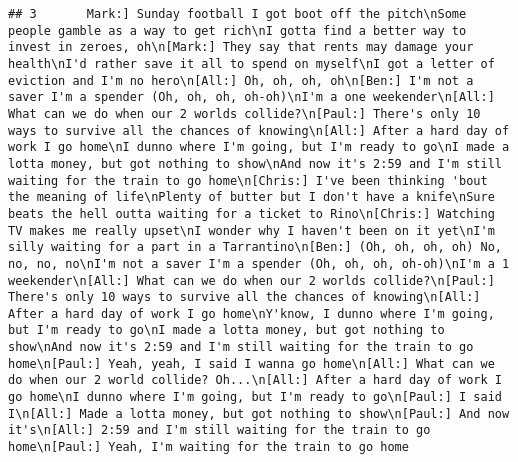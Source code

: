 \documentclass[]{article}
\begin{document}
\begin{verbatim}
## 3       Mark:] Sunday football I got boot off the pitch\nSome people gamble as a way to get rich\nI gotta find a better way to invest in zeroes, oh\n[Mark:] They say that rents may damage your health\nI'd rather save it all to spend on myself\nI got a letter of eviction and I'm no hero\n[All:] Oh, oh, oh, oh\n[Ben:] I'm not a saver I'm a spender (Oh, oh, oh, oh-oh)\nI'm a one weekender\n[All:] What can we do when our 2 worlds collide?\n[Paul:] There's only 10 ways to survive all the chances of knowing\n[All:] After a hard day of work I go home\nI dunno where I'm going, but I'm ready to go\nI made a lotta money, but got nothing to show\nAnd now it's 2:59 and I'm still waiting for the train to go home\n[Chris:] I've been thinking 'bout the meaning of life\nPlenty of butter but I don't have a knife\nSure beats the hell outta waiting for a ticket to Rino\n[Chris:] Watching TV makes me really upset\nI wonder why I haven't been on it yet\nI'm silly waiting for a part in a Tarrantino\n[Ben:] (Oh, oh, oh, oh) No, no, no, no\nI'm not a saver I'm a spender (Oh, oh, oh, oh-oh)\nI'm a 1 weekender\n[All:] What can we do when our 2 worlds collide?\n[Paul:] There's only 10 ways to survive all the chances of knowing\n[All:] After a hard day of work I go home\nY'know, I dunno where I'm going, but I'm ready to go\nI made a lotta money, but got nothing to show\nAnd now it's 2:59 and I'm still waiting for the train to go home\n[Paul:] Yeah, yeah, I said I wanna go home\n[All:] What can we do when our 2 world collide? Oh...\n[All:] After a hard day of work I go home\nI dunno where I'm going, but I'm ready to go\n[Paul:] I said I\n[All:] Made a lotta money, but got nothing to show\n[Paul:] And now it's\n[All:] 2:59 and I'm still waiting for the train to go home\n[Paul:] Yeah, I'm waiting for the train to go home

\end{verbatim}
\end{document}
